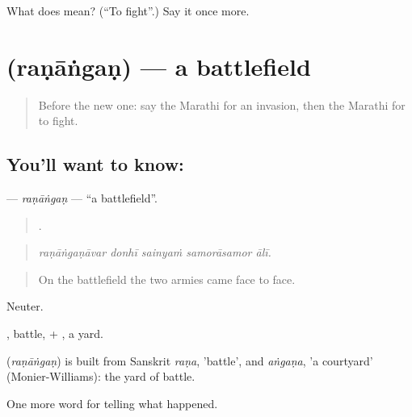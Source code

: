 \begin{tcolorbox}[breakable,colback=teal!4,colframe=teal!35!black,title={Before you move on}]
What does  mean? (\textquotedblleft{}To fight\textquotedblright{}.) Say it once more.
\end{tcolorbox}
\section[\texorpdfstring{\mr{रणांगण} (raṇāṅgaṇ)}{रणांगण (raṇāṅgaṇ)}]{ (raṇāṅgaṇ) — a battlefield}

\label{lesson:MR-C328-ranangan}



\begin{quote}
Before the new one: say the Marathi for an invasion, then the Marathi for to fight.
\end{quote}

\subsection*{You'll want to know: }
\textbf{} — \emph{raṇāṅgaṇ} — \textquotedblleft{}a battlefield\textquotedblright{}.

\begin{quote}
    .
\end{quote}

\begin{quote}
\emph{raṇāṅgaṇāvar donhī sainyaṁ samorāsamor ālī.}
\end{quote}

\begin{quote}
On the battlefield the two armies came face to face.
\end{quote}

Neuter.

, battle, + , a yard.

\begin{cousinweb}
\textbf{} (\emph{raṇāṅgaṇ}) is built from Sanskrit \emph{raṇa}, 'battle', and \emph{aṅgaṇa}, 'a courtyard' (Monier-Williams): the yard of battle.
\end{cousinweb}

\begin{grammarlens}[title={What you've built}]
One more word for telling what happened.
\end{grammarlens}

